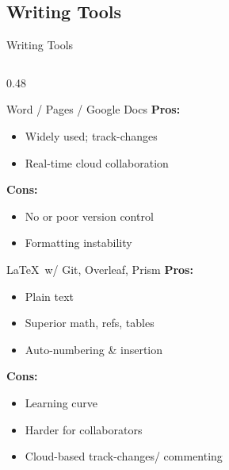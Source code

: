\documentclass{beamer}
\begin{document}
\subsection{Writing Tools}
\begin{frame}{Writing Tools}
    \fontsize{9pt}{8pt}\selectfont
    \begin{columns}[t]
        \begin{column}{0.48\textwidth}
            \begin{block}{Word / Pages / Google Docs}
                \textbf{Pros:}
                \begin{itemize}
                    \item Widely used; track-changes
                    \item Real-time cloud collaboration
                \end{itemize}
                \textbf{Cons:}
                \begin{itemize}
                    \item No or poor version control
                    \item Formatting instability
                \end{itemize}
            \end{block}
            
            \begin{block}{\LaTeX\ w/ Git, Overleaf, Prism}
                \textbf{Pros:}
                \begin{itemize}
                    \item Plain text
                    \item Superior math, refs, tables
                    \item Auto-numbering \& insertion
                \end{itemize}
                \textbf{Cons:}
                \begin{itemize}
                    \item Learning curve
                    \item Harder for collaborators
                    \item Cloud-based track-changes/ commenting
                \end{itemize}
            \end{block}
        \end{column}


\end{columns}
\end{frame}
\end{document}
